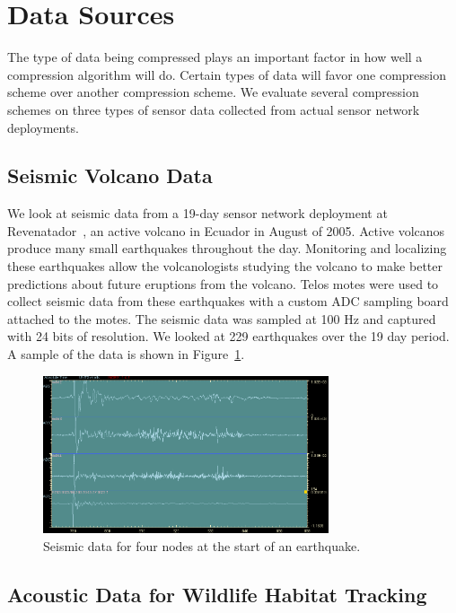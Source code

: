 \section{Data Sources} 
\label{sec-data}

The type of data being compressed plays an important factor in how
well a compression algorithm will do.  Certain types of data will
favor one compression scheme over another compression scheme.  We
evaluate several compression schemes on three types of sensor data
collected from actual sensor network deployments.  

\subsection{Seismic Volcano Data}

We look at seismic data from a 19-day sensor network deployment at
Revenatador~\cite{volcano-osdi06}, an active volcano in Ecuador in
August of 2005.  Active volcanos produce many small earthquakes
throughout the day.  Monitoring and localizing these earthquakes allow
the volcanologists studying the volcano to make better predictions
about future eruptions from the volcano.  Telos motes were used to
collect seismic data from these earthquakes with a custom ADC sampling
board attached to the motes.  The seismic data was sampled at 100 Hz
and captured with 24 bits of resolution.  We looked at 229 earthquakes
over the 19 day period.  A sample of the data is shown in
Figure~\ref{fig:volcano-data}.

\begin{figure}[h]
  \centering
  \includegraphics[width=0.75\textwidth]{figures/volcano-data.png} 
  \caption{Seismic data for four nodes at the start of an earthquake.}
  \label{fig:volcano-data}
\end{figure}

\subsection{Acoustic Data for Wildlife Habitat Tracking}


